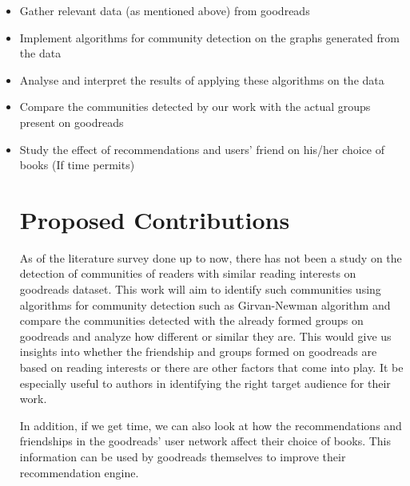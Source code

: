 \documentclass[11pt]{article}
\begin{document}
\begin{itemize}
\item Gather relevant data (as mentioned above) from goodreads
\item Implement algorithms for community detection on the graphs generated from the data
\item Analyse and interpret the results of applying these algorithms on the data
\item Compare the communities detected by our work with the actual groups present on goodreads
\item Study the effect of recommendations and users' friend on his/her choice of books (If time permits)









\section{Proposed Contributions}
As of the literature survey done up to now, there has not been a study on the detection of communities of readers with similar reading interests on goodreads dataset.
This work will aim to identify such communities using algorithms for community detection such as Girvan-Newman algorithm and compare the communities detected with the already formed groups on goodreads and analyze how different or similar they are.
This would give us insights into whether the friendship and groups formed on goodreads are based on reading interests or there are other factors that come into play. It be especially useful to authors in identifying the right target audience for their work.

In addition, if we get time, we can also look at how the recommendations and friendships in the goodreads' user network affect their choice of books. This information can be used by goodreads themselves to improve their recommendation engine.


\end{itemize}
\end{document}
